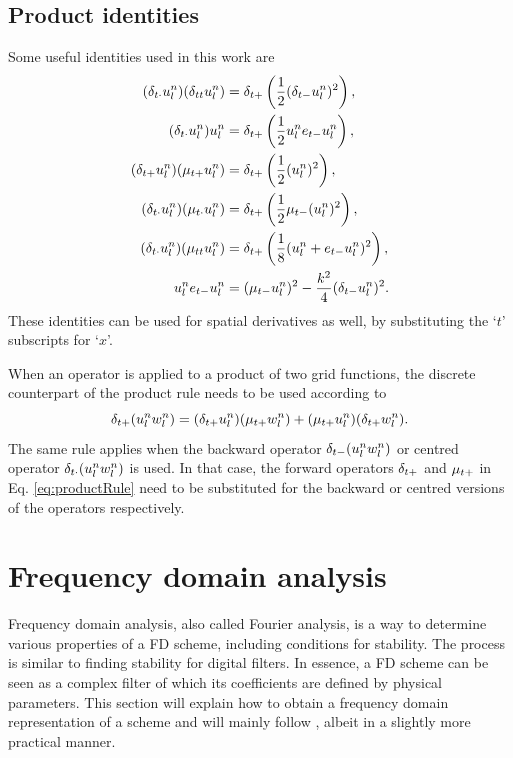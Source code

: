 \subsection{Product identities}\label{sec:prodIdentities}
Some useful identities used in this work are
\begin{subequations}
    \begin{align}
        (\delta_{t\cdot} u_l^n)(\delta_{tt} u_l^n) &= \delta_{t+} \left(\frac{1}{2}(\delta_{t-} u_l^n)^2\right),\label{eq:prodIdentity1}\\
        (\delta_{t\cdot} u_l^n)u_l^n &= \delta_{t+} \left(\frac{1}{2}u_l^n e_{t-}u_l^n\right),\label{eq:prodIdentity2}\\
        (\delta_{t+} u_l^n)(\mu_{t+} u_l^n) &= \delta_{t+} \left(\frac{1}{2}(u_l^n)^2\right),\label{eq:prodIdentity3}\\
        (\delta_{t\cdot} u_l^n)(\mu_{t\cdot}u_l^n) &= \delta_{t+}\left(\frac{1}{2} \mu_{t-}(u_l^n)^2\right),\label{eq:prodIdentity4}\\
        (\delta_{t\cdot} u_l^n)(\mu_{tt} u_l^n) &= \delta_{t+}\left(\frac{1}{8}(u_l^n + e_{t-}u_l^n)^2\right)\label{eq:prodIdentity5},\\
        u_l^n e_{t-}u_l^n &=  (\mu_{t-} u_l^n)^2 - \frac{k^2}{4}(\delta_{t-} u_l^n)^2.\label{eq:prodIdentityEnergyStab}
    \end{align}
\end{subequations}
These identities can be used for spatial derivatives as well, by substituting the `$t$' subscripts for `$x$'.

When an operator is applied to a product of two grid functions, the discrete counterpart of the product rule needs to be used according to
\begin{equation}\label{eq:productRule}
    \delta_{t+} (u_l^nw_l^n) = (\delta_{t+} u_l^n)(\mu_{t+}w_l^n) + (\mu_{t+} u_l^n)(\delta_{t+} w_l^n).
\end{equation}
The same rule applies when the backward operator $\delta_{t-}(u_l^nw_l^n)$ or centred operator $\delta_{t\cdot}(u_l^nw_l^n)$ is used. In that case, the forward operators $\delta_{t+}$ and $\mu_{t+}$ in Eq. \eqref{eq:productRule} need to be substituted for the backward or centred versions of the operators respectively. 

\section{Frequency domain analysis}\label{sec:stabilityAnalysis}
Frequency domain analysis, also called Fourier analysis, is a way to determine various properties of a FD scheme, including conditions for stability. The process is similar to finding stability for digital filters. In essence, a FD scheme can be seen as a complex filter of which its coefficients are defined by physical parameters.
This section will explain how to obtain a frequency domain representation of a scheme and will mainly follow \cite{theBible}, albeit in a slightly more practical manner.

